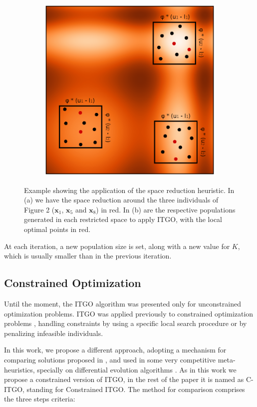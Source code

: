 \begin{figure}[tp]
\begin{subfigure}{.5\textwidth}
  \includegraphics[width=1.1\linewidth]{fig_3.eps}
  \caption{}
  \label{fig:SpaceReduction-b}
\end{subfigure}
\caption{Example showing the application of the space reduction heuristic. In (a) we have the space reduction around the three individuals of Figure 2 ($\bm{x}_1$, $\bm{x}_5$ and $\bm{x}_8$) in red. In (b) are the respective populations generated in each restricted space to apply ITGO, with the local optimal points in red.}\label{fig:SpaceReduction}
\end{figure}


At each iteration, a new population size is set, along with a new value for $K$, which is usually smaller than in the previous iteration.


\subsection{Constrained Optimization}

Until the moment, the ITGO algorithm was presented only for unconstrained optimization problems. ITGO was applied previously to constrained optimization problems \citep{ITGO2, ITGO3}, handling constraints by using a specific local search procedure or by penalizing infeasible individuals.

In this work, we propose a different approach, adopting a mechanism for comparing solutions proposed in \cite{ConHandling}, and used in some very competitive meta-heuristics, specially on differential evolution algorithms \citep{DE1, DE2, DE3}. As in this work we propose a constrained version of ITGO, in the rest of the paper it is named as C-ITGO, standing for Constrained ITGO. The method for comparison comprises the three steps criteria:

